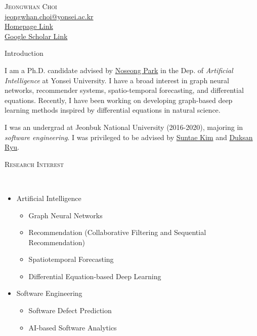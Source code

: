 \documentclass[10pt]{article}
\newenvironment{changemargin}[2]{
  \begin{list}{}{
    \setlength{\topsep}{0pt}
    \setlength{\leftmargin}{#1}
    \setlength{\rightmargin}{#2}
    \setlength{\listparindent}{\parindent}
    \setlength{\itemindent}{\parindent}
    \setlength{\parsep}{\parskip}
  }
  \item[]}{\end{list}
}
\newcommand{\lineover}{
	\begin{changemargin}{-0.05in}{-0.05in}
		\vspace*{-8pt}
		\hrulefill \\
		\vspace*{-2pt}
	\end{changemargin}
}
\newcommand{\header}[1]{
	\begin{changemargin}{-0.5in}{-0.5in}
		\scshape{#1}\\
  	\lineover
	\end{changemargin}
}
\newcommand{\contact}[5]{
	\begin{changemargin}{-0.5in}{-0.5in}
		\begin{center}
			{\Large \scshape {#1}}\\
      {#2} \\  {#3} \\ {#4} \\ {#5}
		\end{center}
	\end{changemargin}
}
\newenvironment{body} {
	\vspace*{-16pt}
	\begin{changemargin}{-0.25in}{-0.5in}
  }
	{\end{changemargin}
}
\begin{document}

\vspace{10pt}

\contact{Jeongwhan Choi}{\href{mailto:email@address.com}{jeongwhan.choi@yonsei.ac.kr}}{\href{https://jeongwhanchoi.me}{Homepage Link}}{\href{https://scholar.google.com/citations?user=3MNElkYAAAAJ&hl=en}{Google Scholar Link}}

\header{Introduction}
\begin{body}
    \vspace{14pt}
 I am a Ph.D. candidate advised by \href{https://scholar.google.com/citations?user=VSuM3gYAAAAJ&hl=en}{Noseong Park} in the Dep. of \emph{Artificial Intelligence} at Yonsei University. I have a broad interest in graph neural networks, recommender systems, spatio-temporal forecasting, and differential equations. Recently, I have been working on developing graph-based deep learning methods inspired by differential equations in natural science.

I was an undergrad at Jeonbuk National University (2016-2020), majoring in \emph{software engineering}. I was privileged to be advised by \href{https://scholar.google.com/citations?user=IN_HTKEAAAAJ&hl=en}{Suntae Kim} and \href{https://scholar.google.com/citations?user=BHue-MMAAAAJ&hl=en}{Duksan Ryu}.
\end{body}

\medskip

\header{Research Interest}

\begin{body}
    \vspace{14pt}
    \begin{itemize}
        \item Artificial Intelligence
        \begin{itemize}
            \item Graph Neural Networks
            \item Recommendation (Collaborative Filtering and Sequential Recommendation)
            \item Spatiotemporal Forecasting
            \item Differential Equation-based Deep Learning
        \end{itemize}
        \item Software Engineering
        \begin{itemize}
            \item Software Defect Prediction
            \item AI-based Software Analytics
        \end{itemize}
    \end{itemize}
\end{body}
\medskip
\end{document}
